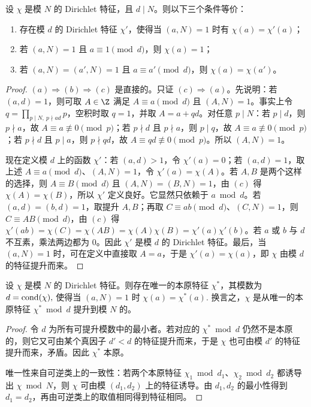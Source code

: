 \begin{lemma}[降模判别]
设 \(\chi\) 是模 \(N\) 的 Dirichlet 特征，且 \(d\mid N\)。则以下三个条件等价：
\begin{enumerate}[label=(\alph*)]
  \item 存在模 \(d\) 的 Dirichlet 特征 \(\chi'\)，使得当 \((a,N)=1\) 时有 \(\chi(a)=\chi'(a)\)；
  \item 若 \((a,N)=1\) 且 \(a\equiv1\pmod d\)，则 \(\chi(a)=1\)；
  \item 若 \((a,N)=(a',N)=1\) 且 \(a\equiv a'\pmod d\)，则 \(\chi(a)=\chi(a')\)。
\end{enumerate}
\end{lemma}

\begin{proof}
\((a)\Rightarrow(b)\Rightarrow(c)\) 是直接的。只证 \((c)\Rightarrow(a)\)。先说明：若 \((a,d)=1\)，则可取 \(A\in\Z\) 满足 \(A\equiv a\pmod d\) 且 \((A,N)=1\)。事实上令 \(q=\prod_{p\mid N,\ p\nmid ad}p\)，空积时取 \(q=1\)，并取 \(A=a+qd\)。对任意 \(p\mid N\)：若 \(p\mid d\)，则 \(p\nmid a\)，故 \(A\equiv a\not\equiv0\pmod p\)；若 \(p\nmid d\) 且 \(p\nmid a\)，则 \(p\mid q\)，故 \(A\equiv a\not\equiv0\pmod p\)；若 \(p\nmid d\) 且 \(p\mid a\)，则 \(p\nmid qd\)，故 \(A\equiv qd\not\equiv0\pmod p\)。所以 \((A,N)=1\)。

现在定义模 \(d\) 上的函数 \(\chi'\)：若 \((a,d)>1\)，令 \(\chi'(a)=0\)；若 \((a,d)=1\)，取上述 \(A\equiv a\pmod d\)、\((A,N)=1\)，令 \(\chi'(a)=\chi(A)\)。若 \(A,B\) 是两个这样的选择，则 \(A\equiv B\pmod d\) 且 \((A,N)=(B,N)=1\)，由 \((c)\) 得 \(\chi(A)=\chi(B)\)，所以 \(\chi'\) 定义良好。它显然只依赖于 \(a\bmod d\)。若 \((a,d)=(b,d)=1\)，取提升 \(A,B\)；再取 \(C\equiv ab\pmod d\)、\((C,N)=1\)，则 \(C\equiv AB\pmod d\)，由 \((c)\) 得 \(\chi'(ab)=\chi(C)=\chi(AB)=\chi(A)\chi(B)=\chi'(a)\chi'(b)\)。若 \(a\) 或 \(b\) 与 \(d\) 不互素，乘法两边都为 \(0\)。因此 \(\chi'\) 是模 \(d\) 的 Dirichlet 特征。最后，当 \((a,N)=1\) 时，可在定义中直接取 \(A=a\)，于是 \(\chi'(a)=\chi(a)\)，即 \(\chi\) 由模 \(d\) 的特征提升而来。
\end{proof}

\begin{theorem}[导子的基本刻画]
设 $\chi$ 是模 $N$ 的 Dirichlet 特征。则存在唯一的本原特征 $\chi^\ast$，其模数为
\(
  d=\operatorname{cond}(\chi),
\)
使得当 $(a,N)=1$ 时
\(
  \chi(a)=\chi^\ast(a).
\)
换言之，$\chi$ 是从唯一的本原特征 $\chi^\ast\bmod d$ 提升到模 $N$ 的。
\end{theorem}

\begin{proof}
令 $d$ 为所有可提升模数中的最小者。若对应的 $\chi^\ast\bmod d$ 仍然不是本原的，则它又可由某个真因子 $d'<d$ 的特征提升而来，于是 $\chi$ 也可由模 $d'$ 的特征提升而来，矛盾。因此 $\chi^\ast$ 本原。

唯一性来自可逆类上的一致性：若两个本原特征 $\chi_1\bmod d_1$、$\chi_2\bmod d_2$ 都诱导出 $\chi\bmod N$，则 $\chi$ 可由模
$(d_1,d_2)$ 上的特征诱导。由 $d_1,d_2$ 的最小性得到 $d_1=d_2$，再由可逆类上的取值相同得到特征相同。
\end{proof}

